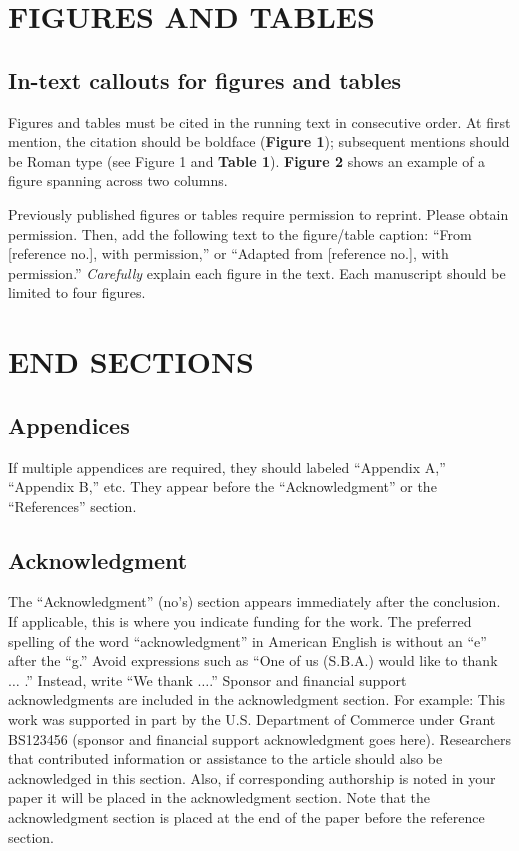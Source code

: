 \documentclass{IEEEcsmag}
\begin{document}
\section{FIGURES AND TABLES}

\subsection{In-text callouts for figures and tables}

Figures and tables must be cited in the running text in consecutive order. At first mention, the citation should be boldface ({\bf Figure 1}); subsequent mentions should be Roman type (see Figure 1 and {\bf Table 1}). {\bf Figure 2} shows an example of a figure spanning across two columns.
 

Previously published figures or tables require permission to reprint. Please obtain permission. Then, add the following text to the figure/table caption: ``From [reference no.], with permission,'' or ``Adapted from [reference no.], with permission.'' {\it Carefully} explain each figure in the text. Each manuscript should be limited to four figures.\pagebreak

\section{END SECTIONS}

\subsection{Appendices}

If multiple appendices are required, they should labeled ``Appendix A,'' ``Appendix B,'' etc. They appear before the ``Acknowledgment'' or the ``References'' section.

\subsection{Acknowledgment}

The ``Acknowledgment'' (no's) section appears immediately after the conclusion. If applicable, this is where you indicate funding for the work. The preferred spelling of the word ``acknowledgment'' in American English is without an ``e'' after the ``g.'' Avoid expressions such as ``One of us (S.B.A.) would like to thank $\ldots$ .'' Instead, write ``We thank $\ldots$.'' Sponsor and financial support acknowledgments are included in the acknowledgment section. For example: This work was supported in part by the U.S. Department of Commerce under Grant BS123456 (sponsor and financial support acknowledgment goes here). Researchers that contributed information or assistance to the article should also be acknowledged in this section. Also, if corresponding authorship is noted in your paper it will be placed in the acknowledgment section. Note that the acknowledgment section is placed at the end of the paper before the reference section.
\end{document}
